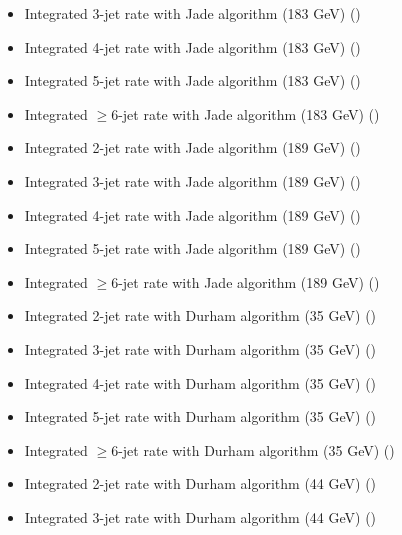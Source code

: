 \begin{itemize}
  \item Integrated 3-jet rate with Jade algorithm (183 GeV) ({\smaller {}})
  \item Integrated 4-jet rate with Jade algorithm (183 GeV) ({\smaller {}})
  \item Integrated 5-jet rate with Jade algorithm (183 GeV) ({\smaller {}})
  \item Integrated $\geq$6-jet rate with Jade algorithm (183 GeV) ({\smaller {}})
  \item Integrated 2-jet rate with Jade algorithm (189 GeV) ({\smaller {}})
  \item Integrated 3-jet rate with Jade algorithm (189 GeV) ({\smaller {}})
  \item Integrated 4-jet rate with Jade algorithm (189 GeV) ({\smaller {}})
  \item Integrated 5-jet rate with Jade algorithm (189 GeV) ({\smaller {}})
  \item Integrated $\geq$6-jet rate with Jade algorithm (189 GeV) ({\smaller {}})
  \item Integrated 2-jet rate with Durham algorithm (35 GeV) ({\smaller {}})
  \item Integrated 3-jet rate with Durham algorithm (35 GeV) ({\smaller {}})
  \item Integrated 4-jet rate with Durham algorithm (35 GeV) ({\smaller {}})
  \item Integrated 5-jet rate with Durham algorithm (35 GeV) ({\smaller {}})
  \item Integrated $\geq$6-jet rate with Durham algorithm (35 GeV) ({\smaller {}})
  \item Integrated 2-jet rate with Durham algorithm (44 GeV) ({\smaller {}})
  \item Integrated 3-jet rate with Durham algorithm (44 GeV) ({\smaller {}})

\end{itemize}
